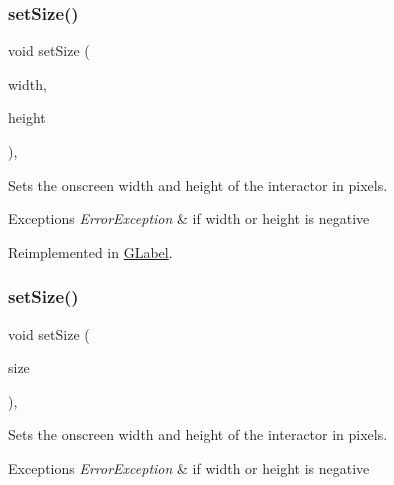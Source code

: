 \subsubsection{\texorpdfstring{set\+Size()}{setSize()}\hspace{0.1cm}{\footnotesize\ttfamily [1/2]}}
{\footnotesize\ttfamily void set\+Size (\begin{DoxyParamCaption}\item[{double}]{width,  }\item[{double}]{height }\end{DoxyParamCaption})\hspace{0.3cm}{\ttfamily [virtual]}, {\ttfamily [inherited]}}



Sets the onscreen width and height of the interactor in pixels. 


\begin{DoxyExceptions}{Exceptions}
{\em Error\+Exception} & if width or height is negative \\
\hline
\end{DoxyExceptions}


Reimplemented in \mbox{\hyperlink{classsgl_1_1GLabel_a8ba9af72c23f52d4b93096a13a11f150}{G\+Label}}.

\mbox{\label{classsgl_1_1GInteractor_ae2b628228f192c2702c4ce941b2af68f}} 
\subsubsection{\texorpdfstring{set\+Size()}{setSize()}\hspace{0.1cm}{\footnotesize\ttfamily [2/2]}}
{\footnotesize\ttfamily void set\+Size (\begin{DoxyParamCaption}\item[{const \mbox{\hyperlink{structsgl_1_1GDimension}{G\+Dimension}} \&}]{size }\end{DoxyParamCaption})\hspace{0.3cm}{\ttfamily [virtual]}, {\ttfamily [inherited]}}



Sets the onscreen width and height of the interactor in pixels. 


\begin{DoxyExceptions}{Exceptions}
{\em Error\+Exception} & if width or height is negative \\
\hline
\end{DoxyExceptions}


